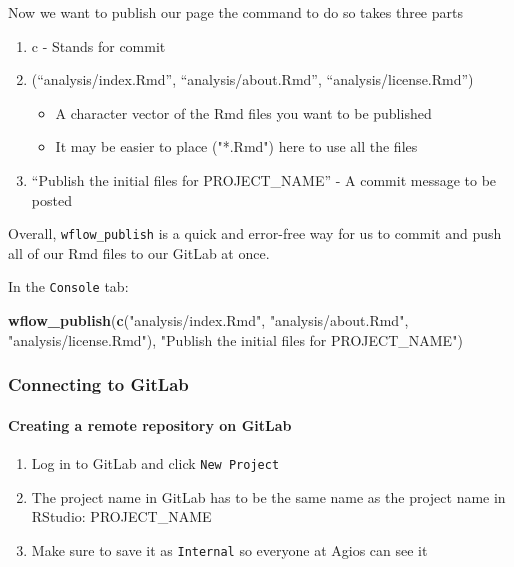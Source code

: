 \documentclass[openany]{article}
\newenvironment{Shaded}{\begin{snugshade}}{\end{snugshade}}
\newcommand{\KeywordTok}[1]{\textcolor[rgb]{0.13,0.29,0.53}{\textbf{#1}}}
\newcommand{\NormalTok}[1]{#1}
\newcommand{\StringTok}[1]{\textcolor[rgb]{0.31,0.60,0.02}{#1}}
\providecommand{\tightlist}{%
  \setlength{\itemsep}{0pt}\setlength{\parskip}{0pt}}
\let\oldparagraph\paragraph
\renewcommand{\paragraph}[1]{\oldparagraph{#1}\mbox{}}
\begin{document}
Now we want to publish our page the command to do so takes three parts

\begin{enumerate}
\def\labelenumi{\arabic{enumi}.}
\tightlist
\item
  c - Stands for commit
\item
  (``analysis/index.Rmd'', ``analysis/about.Rmd'', ``analysis/license.Rmd'')

  \begin{itemize}
  \tightlist
  \item
    A character vector of the Rmd files you want to be published
  \item
    It may be easier to place ("*.Rmd") here to use all the files
  \end{itemize}
\item
  ``Publish the initial files for PROJECT\_NAME'' - A commit message to be posted
\end{enumerate}

Overall, \texttt{wflow\_publish} is a quick and error-free way for us to commit and push all of our Rmd files to our GitLab at once.

In the \texttt{Console} tab:

\begin{Shaded}
\begin{Highlighting}[]
\KeywordTok{wflow_publish}\NormalTok{(}\KeywordTok{c}\NormalTok{(}\StringTok{"analysis/index.Rmd"}\NormalTok{, }
    \StringTok{"analysis/about.Rmd"}\NormalTok{, }\StringTok{"analysis/license.Rmd"}\NormalTok{), }
    \StringTok{"Publish the initial files for PROJECT_NAME"}\NormalTok{)}
\end{Highlighting}
\end{Shaded}

\hypertarget{connecting-to-gitlab-1}{%
\subsubsection{Connecting to GitLab}\label{connecting-to-gitlab-1}}

\hypertarget{creating-a-remote-repository-on-gitlab}{%
\paragraph{Creating a remote repository on GitLab}\label{creating-a-remote-repository-on-gitlab}}

\begin{enumerate}
\def\labelenumi{\arabic{enumi}.}
\tightlist
\item
  Log in to GitLab and click \texttt{New\ Project}
\item
  The project name in GitLab has to be the same name as the project name in RStudio: PROJECT\_NAME
\item
  Make sure to save it as \texttt{Internal} so everyone at Agios can see it
\end{enumerate}
\end{document}

